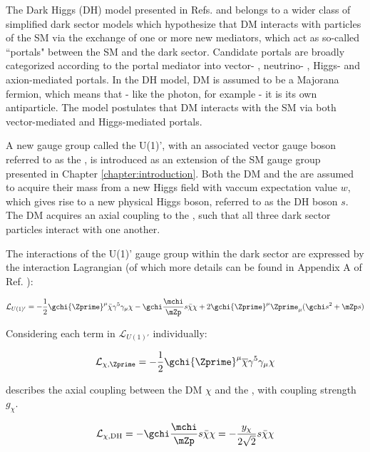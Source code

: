 The Dark Higgs (DH) model presented in Refs. \cite{Duerr2017} and \cite{Duerr_2016} belongs to a wider class of simplified dark sector models which hypothesize that DM interacts with particles of the SM via the exchange of one or more new mediators, which act as so-called ``portals" between the SM and the dark sector. Candidate portals are broadly categorized according to the portal mediator into vector- \cite{vector_mediator_2012,vector_mediator_2020}, neutrino- \cite{neutrino_mediator_2019}, Higgs- \cite{higgs_mediator_2020} and axion-mediated \cite{axion_mediator_2009} portals. In the DH model, DM is assumed to be a Majorana fermion, which means that - like the photon, for example - it is its own antiparticle. The model postulates that DM interacts with the SM via both vector-mediated and Higgs-mediated portals. 

A new gauge group called the U(1)', with an associated vector gauge boson referred to as the \Zprime, is introduced as an extension of the SM gauge group presented in Chapter \ref{chapter:introduction}. Both the DM and the \Zprime are assumed to acquire their mass from a new Higgs field with vaccum expectation value \(w\), which gives rise to a new physical Higgs boson, referred to as the DH boson \(s\). The DM acquires an axial coupling to the \Zprime, such that all three dark sector particles interact with one another. 

The interactions of the U(1)' gauge group within the dark sector are expressed by the interaction Lagrangian (of which more details can be found in Appendix A of Ref. \cite{Duerr_2016}):

\begin{equation}
\label{eq:DH_Lagrangian}
    \mathcal{L}_{U(1)'} = - \frac{1}{2} \gchi {\Zprime}^{\mu} \bar{\chi} \gamma^{5} \gamma_{\mu} \chi - \gchi \frac{\mchi}{\mZp} s \bar{\chi} \chi + 2 \gchi {\Zprime}^{\mu} {\Zprime}_{\mu} (\gchi s^2 + \mZp s)
\end{equation}

\noindent Considering each term in \(\mathcal{L}_{U(1)'}\) individually: 

\begin{equation}
\mathcal{L}_{\chi, \Zprime} = - \frac{1}{2} \gchi {\Zprime}^{\mu} \overline{\chi} \gamma^{5} \gamma_{\mu} \chi
\end{equation}

\noindent describes the axial coupling between the DM \(\chi\) and the \Zprime, with coupling strength \(g_\chi\). 

\begin{equation}
\label{eq:Lagrangian_chi_s}
\mathcal{L}_{\chi, \text{DH}} =- \gchi \frac{\mchi}{\mZp} s \bar{\chi} \chi = - \frac{y_\chi}{2\sqrt{2}} s \bar{\chi} \chi
\end{equation}

